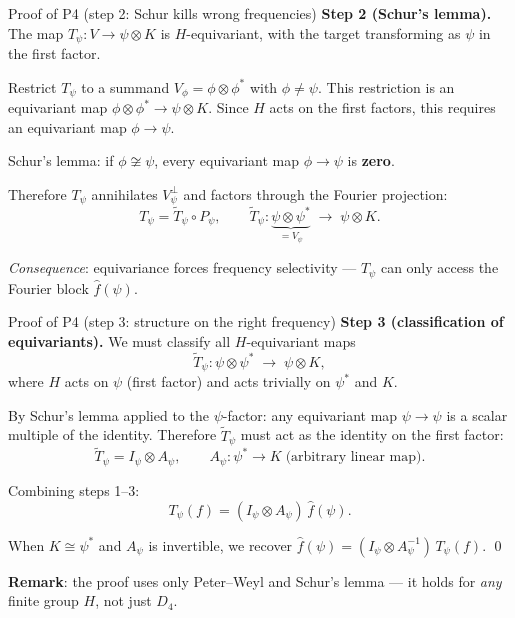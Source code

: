 \documentclass[aspectratio=169]{beamer}
\begin{document}
\begin{frame}{Proof of P4 (step 2: Schur kills wrong frequencies)}\small
  \textbf{Step 2 (Schur's lemma).} The map $T_\psi : V \to \psi \otimes K$ is $H$-equivariant, with the target transforming as $\psi$ in the first factor.

  \medskip

  Restrict $T_\psi$ to a summand $V_\phi = \phi \otimes \phi^*$ with $\phi \neq \psi$. This restriction is an equivariant map $\phi \otimes \phi^* \to \psi \otimes K$. Since $H$ acts on the first factors, this requires an equivariant map $\phi \to \psi$.

  \medskip

  Schur's lemma: if $\phi \not\cong \psi$, every equivariant map $\phi \to \psi$ is \textbf{zero}.

  \medskip

  Therefore $T_\psi$ annihilates $V_\psi^\perp$ and factors through the Fourier projection:
  \[
    T_\psi = \tilde{T}_\psi \circ P_\psi, \qquad \tilde{T}_\psi : \underbrace{\psi \otimes \psi^*}_{= V_\psi} \;\longrightarrow\; \psi \otimes K.
  \]

  \medskip

  \textit{Consequence}: equivariance forces frequency selectivity --- $T_\psi$ can only access the Fourier block $\hat{f}(\psi)$.
\end{frame}

\begin{frame}{Proof of P4 (step 3: structure on the right frequency)}\small
  \textbf{Step 3 (classification of equivariants).} We must classify all $H$-equivariant maps
  \[
    \tilde{T}_\psi : \psi \otimes \psi^* \;\longrightarrow\; \psi \otimes K,
  \]
  where $H$ acts on $\psi$ (first factor) and acts trivially on $\psi^*$ and $K$.

  \medskip

  By Schur's lemma applied to the $\psi$-factor: any equivariant map $\psi \to \psi$ is a scalar multiple of the identity. Therefore $\tilde{T}_\psi$ must act as the identity on the first factor:
  \[
    \tilde{T}_\psi = I_\psi \otimes A_\psi, \qquad A_\psi : \psi^* \to K \;\text{(arbitrary linear map)}.
  \]

  \medskip

  Combining steps 1--3:
  \[
    \boxed{T_\psi(f) = (I_\psi \otimes A_\psi)\,\hat{f}(\psi).}
  \]

  When $K \cong \psi^*$ and $A_\psi$ is invertible, we recover $\hat{f}(\psi) = (I_\psi \otimes A_\psi^{-1})\,T_\psi(f)$. \qed

  \medskip

  \textbf{Remark}: the proof uses only Peter--Weyl and Schur's lemma --- it holds for \textit{any} finite group $H$, not just $D_4$.
\end{frame}
\end{document}

